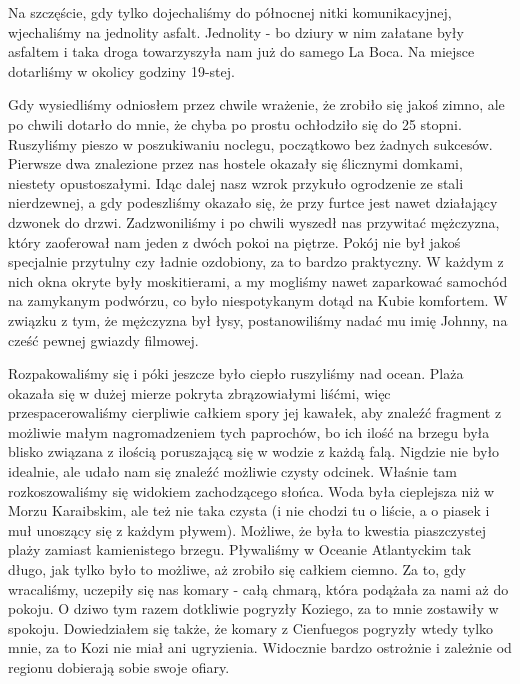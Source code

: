 \noindent Na szczęście, gdy tylko dojechaliśmy do północnej nitki komunikacyjnej, wjechaliśmy na jednolity asfalt.
Jednolity - bo dziury w nim załatane były asfaltem i taka droga towarzyszyła nam już do samego La Boca.
Na miejsce dotarliśmy w okolicy godziny 19-stej.
\par Gdy wysiedliśmy odniosłem przez chwile wrażenie, że zrobiło się jakoś zimno, ale po chwili dotarło do mnie, że chyba po prostu ochłodziło się do 25 stopni.
Ruszyliśmy pieszo w poszukiwaniu noclegu, początkowo bez żadnych sukcesów.
Pierwsze dwa znalezione przez nas hostele okazały się ślicznymi domkami, niestety opustoszałymi.
Idąc dalej nasz wzrok przykuło ogrodzenie ze stali nierdzewnej, a gdy podeszliśmy okazało się, że przy furtce jest nawet działający dzwonek do drzwi.
Zadzwoniliśmy i po chwili wyszedł nas przywitać mężczyzna, który zaoferował nam jeden z dwóch pokoi na piętrze.
Pokój nie był jakoś specjalnie przytulny czy ładnie ozdobiony, za to bardzo praktyczny.
W każdym z nich okna okryte były moskitierami, a my mogliśmy nawet zaparkować samochód na zamykanym podwórzu, co było niespotykanym dotąd na Kubie komfortem.
W związku z tym, że mężczyzna był łysy, postanowiliśmy nadać mu imię Johnny, na cześć pewnej gwiazdy filmowej.
\par Rozpakowaliśmy się i póki jeszcze było ciepło ruszyliśmy nad ocean.
Plaża okazała się w dużej mierze pokryta zbrązowiałymi liśćmi, więc przespacerowaliśmy cierpliwie całkiem spory jej kawałek, aby znaleźć fragment z możliwie małym nagromadzeniem tych paprochów, bo ich ilość na brzegu była blisko związana z ilością poruszającą się w wodzie z każdą falą.
Nigdzie nie było idealnie, ale udało nam się znaleźć możliwie czysty odcinek.
Właśnie tam rozkoszowaliśmy się widokiem zachodzącego słońca.
Woda była cieplejsza niż w Morzu Karaibskim, ale też nie taka czysta (i nie chodzi tu o liście, a o piasek i muł unoszący się z każdym pływem).
Możliwe, że była to kwestia piaszczystej plaży zamiast kamienistego brzegu.
Pływaliśmy w Oceanie Atlantyckim tak długo, jak tylko było to możliwe, aż zrobiło się całkiem ciemno.
Za to, gdy wracaliśmy, uczepiły się nas komary - całą chmarą, która podążała za nami aż do pokoju.
O dziwo tym razem dotkliwie pogryzły Koziego, za to mnie zostawiły w spokoju.
Dowiedziałem się także, że komary z Cienfuegos pogryzły wtedy tylko mnie, za to Kozi nie miał ani ugryzienia.
Widocznie bardzo ostrożnie i zależnie od regionu dobierają sobie swoje ofiary.